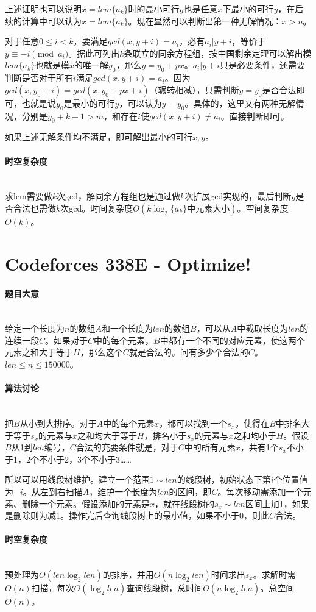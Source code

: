 \documentclass[UTF8]{ctexart}
\newcommand{\myparagraph}[1]{\paragraph{#1}\mbox{}\\}
\theoremstyle{nonumberplain}
\begin{document}
			上述证明也可以说明$x=lcm\{a_k\}$时的最小可行$y$也是任意$x$下最小的可行$y$，在后续的计算中可以认为$x=lcm\{a_k\}$。现在显然可以判断出第一种无解情况：$x>n$。
			
			对于任意$0 \leq i < k$，要满足$gcd(x,y+i)=a_i$，必有$a_i | y+i$，等价于$y \equiv -i \pmod{a_i}$。据此可列出$k$条联立的同余方程组，按中国剩余定理可以解出模$lcm\{a_k\}$也就是模$x$的唯一解$y_0$，那么$y=y_0+px$。$a_i | y+i$只是必要条件，还需要判断是否对于所有$i$满足$gcd(x,y+i)=a_i$。因为$gcd(x,y_0+i)=gcd(x,y_0+px+i)$（辗转相减），只需判断$y=y_0$是否合法即可，也就是说$y_0$是最小的可行$y$，可以认为$y=y_0$。具体的，这里又有两种无解情况，分别是$y_0+k-1>m$，和存在$i$使$gcd(x,y+i)\not=a_i$。直接判断即可。
			
			如果上述无解条件均不满足，即可解出最小的可行$x,y$。
			
		\myparagraph{时空复杂度}
		
			求lcm需要做$k$次gcd，解同余方程组也是通过做$k$次扩展gcd实现的，最后判断$y$是否合法也需做$k$次gcd。时间复杂度$O(k\log_2\{a_k\}\mbox{中元素大小})$。空间复杂度$O(k)$。
	
	\section{Codeforces 338E - Optimize!}
	
		\myparagraph{题目大意}
		
			给定一个长度为$n$的数组$A$和一个长度为$len$的数组$B$，可以从$A$中截取长度为$len$的连续一段$C$。如果对于$C$中的每个元素，$B$中都有一个不同的对应元素，使这两个元素之和大于等于$H$，那么这个$C$就是合法的。问有多少个合法的$C$。$len \leq n \leq 150000$。
		
		\myparagraph{算法讨论}
		
			把$B$从小到大排序。对于$A$中的每个元素$x$，都可以找到一个$s_x$，使得在$B$中排名大于等于$s_x$的元素与$x$之和均大于等于$H$，排名小于$s_x$的元素与$x$之和均小于$H$。假设$B$从1到$len$编号，$C$合法的充要条件就是，对于$C$中的所有元素$x$，共有1个$s_x$不小于1，2个不小于2，3个不小于3……
			
			所以可以用线段树维护。建立一个范围$1 \sim len$的线段树，初始状态下第$i$个位置值为$-i$。从左到右扫描$A$，维护一个长度为$len$的区间，即$C$。每次移动需添加一个元素、删除一个元素。假设添加的元素是$x$，就在线段树的$s_x \sim len$区间上加1，如果是删除则为减1。操作完后查询线段树上的最小值，如果不小于0，则此$C$合法。
		
		\myparagraph{时空复杂度}
		
			预处理为$O(len\log_2len)$的排序，并用$O(n\log_2len)$时间求出$s_x$。求解时需$O(n)$扫描，每次$O(\log_2len)$查询线段树，总时间$O(n\log_2len)$。总空间$O(n)$。
	
\end{document}
